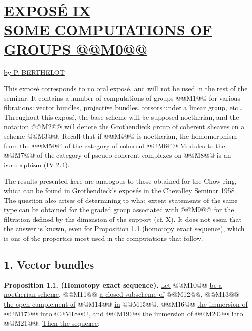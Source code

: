 \section*{\underline{EXPOSÉ IX}\\[3pt] \underline{\underline{SOME COMPUTATIONS OF GROUPS @@M0@@}}}
\begin{center}
\underline{by P. BERTHELOT}
\end{center}

This exposé corresponds to no oral exposé, and will not be used in the rest of the seminar. It contains a number of computations of groups @@M1@@ for various fibrations: vector bundles, projective bundles, torsors under a linear group, etc\ldots{} Throughout this exposé, the base scheme will be supposed noetherian, and the notation @@M2@@ will denote the Grothendieck group of coherent sheaves on a scheme @@M3@@. Recall that if @@M4@@ is noetherian, the homomorphism from the @@M5@@ of the category of coherent @@M6@@-Modules to the @@M7@@ of the category of pseudo-coherent complexes on @@M8@@ is an isomorphism (IV 2.4).

The results presented here are analogous to those obtained for the Chow ring, which can be found in Grothendieck's exposés in the Chevalley Seminar 1958. The question also arises of determining to what extent statements of the same type can be obtained for the graded group associated with @@M9@@ for the filtration defined by the dimension of the support (cf. X). It does not seem that the answer is known, even for Proposition 1.1 (homotopy exact sequence), which is one of the properties most used in the computations that follow.

\subsection*{1. Vector bundles}

\textbf{Proposition 1.1. (Homotopy exact sequence).} \uline{Let} @@M10@@ \uline{be a noetherian scheme}, @@M11@@ \uline{a closed subscheme of} @@M12@@, @@M13@@ \uline{the open complement of} @@M14@@ \uline{in} @@M15@@, @@M16@@ \uline{the immersion of} @@M17@@ \uline{into} @@M18@@, \uline{and} @@M19@@ \uline{the immersion of} @@M20@@ \uline{into} @@M21@@. \uline{Then the sequence}:

